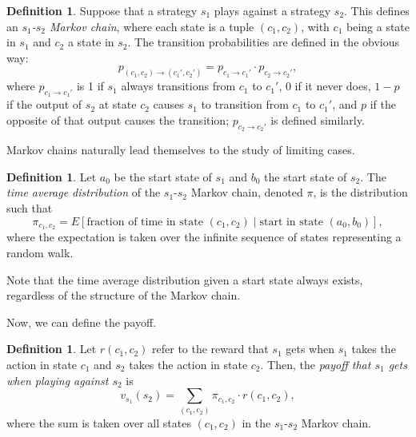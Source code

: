 \documentclass[12pt]{article}
\theoremstyle{definition}
\newtheorem{definition}[theorem]{Definition}
\theoremstyle{remark}
\begin{document}
\begin{definition}
  Suppose that a strategy $s_1$ plays against a strategy $s_2$. This defines an \textit{$s_1$-$s_2$ Markov chain}, where each state is a tuple $(c_1,c_2)$, with $c_1$ being a state in $s_1$ and $c_2$ a state in $s_2$. The transition probabilities are defined in the obvious way: \begin{equation*}
    p_{(c_1,c_2) \to (c_1', c_2')} = p_{c_1 \to c_1'} \cdot p_{c_2 \to c_2'},
  \end{equation*} where $p_{c_1 \to c_1'}$ is 1 if $s_1$ always transitions from $c_1$ to $c_1'$, 0 if it never does, $1-p$ if the output of $s_2$ at state $c_2$ causes $s_1$ to transition from $c_1$ to $c_1'$, and $p$ if the opposite of that output causes the transition; $p_{c_2 \to c_2'}$ is defined similarly.
\end{definition}

Markov chains naturally lead themselves to the study of limiting cases.

\begin{definition}
  \label{timeaveragedistribution}
  Let $a_0$ be the start state of $s_1$ and $b_0$ the start state of $s_2$. The \textit{time average distribution} of the $s_1$-$s_2$ Markov chain, denoted $\pi$, is the distribution such that \begin{equation*}
    \pi_{c_1, c_2} = E \left[ \text{fraction of time in state $(c_1,c_2)$} \mid \text{start in state } (a_0, b_0)  \right],
  \end{equation*}
  where the expectation is taken over the infinite sequence of states representing a random walk.
\end{definition}

Note that the time average distribution given a start state always exists, regardless of the structure of the Markov chain.

Now, we can define the payoff.

\begin{definition}
  \label{payofftimeaverage}
  Let $r(c_1, c_2)$ refer to the reward that $s_1$ gets when $s_1$ takes the action in state $c_1$ and $s_2$ takes the action in state $c_2$. Then, the \textit{payoff that $s_1$ gets when playing against $s_2$} is
  \begin{equation*}
    v_{s_1}(s_2) = \sum_{(c_1,c_2)} \pi_{c_1,c_2} \cdot r(c_1, c_2),
  \end{equation*}
  where the sum is taken over all states $(c_1,c_2)$ in the $s_1$-$s_2$ Markov chain.
\end{definition}
\end{document}
